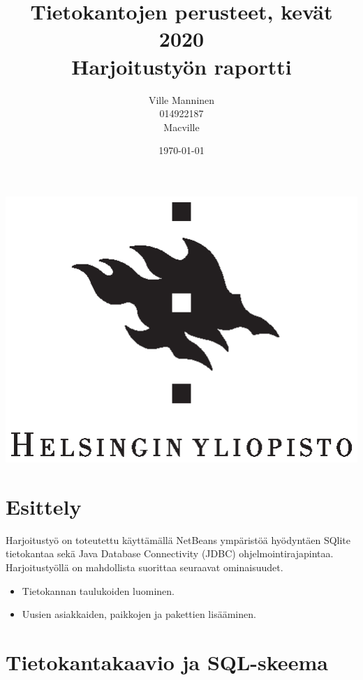 \documentclass[12pt,a4paper]{article}
\begin{document}
\title{Tietokantojen perusteet, kevät 2020 \\
Harjoitustyön raportti}
\author{Ville Manninen \\014922187 \\Macville}
\date{\today}
\cleapage\maketitle
\begin{center}
\vspace{2cm}
\includegraphics{university-of-helsinki-2.eps} 
\end{center}
\thispagestyle{empty}

\newpage
\tableofcontents
\newpage
\section{Esittely}
Harjoitustyö on toteutettu käyttämällä NetBeans ympäristöä hyödyntäen SQlite tietokantaa sekä Java Database Connectivity (JDBC) ohjelmointirajapintaa. Harjoitustyöllä on mahdollista suorittaa seuraavat ominaisuudet.
\begin{itemize}
\item Tietokannan taulukoiden luominen.
\item Uusien asiakkaiden, paikkojen ja pakettien lisääminen.
\end{itemize}



\newpage
\section{Tietokantakaavio ja SQL-skeema}
\end{document}
